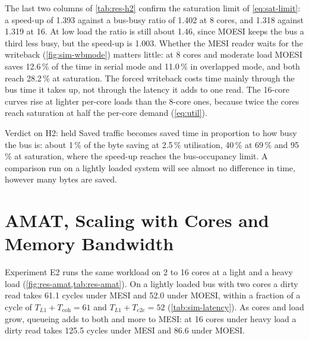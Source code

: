 The last two columns of \cref{tab:res-h2} confirm the saturation limit of
\cref{eq:sat-limit}: a speed-up of 1.393 against a bus-busy ratio of 1.402 at 8
cores, and 1.318 against 1.319 at 16. At low load the ratio is still about 1.46,
since MOESI keeps the bus a third less busy, but the speed-up is 1.003. Whether the
MESI reader waits for the writeback (\cref{fig:sim-wbmode}) matters little: at 8
cores and moderate load MOESI saves 12.6\,\% of the time in serial mode and 11.0\,\%
in overlapped mode, and both reach 28.2\,\% at saturation. The forced writeback
costs time mainly through the bus time it takes up, not through the latency it adds
to one read. The 16-core curves rise at lighter per-core loads than the 8-core
ones, because twice the cores reach saturation at half the per-core demand
(\cref{eq:util}).

\begin{verdictbox}{Verdict on H2: held}
Saved traffic becomes saved time in proportion to how busy the bus is: about 1\,\%
of the byte saving at 2.5\,\% utilisation, 40\,\% at 69\,\% and 95\,\% at
saturation, where the speed-up reaches the bus-occupancy limit. A comparison run on
a lightly loaded system will see almost no difference in time, however many bytes
are saved.
\end{verdictbox}

\section{AMAT, Scaling with Cores and Memory Bandwidth}
\label{sec:res-amat}
\label{sec:res-memory}
%

Experiment E2 runs the same workload on 2 to 16 cores at a light and a heavy load
(\cref{fig:res-amat,tab:res-amat}). On a lightly loaded bus with two cores a dirty
read takes 61.1 cycles under MESI and 52.0 under MOESI, within a fraction of a
cycle of $T_{L1}+T_{\mathrm{coh}}=61$ and $T_{L1}+T_{\mathrm{c2c}}=52$
(\cref{tab:sim-latency}). As cores and load grow, queueing adds to both and more to
MESI: at 16 cores under heavy load a dirty read takes 125.5 cycles under MESI and
86.6 under MOESI.

